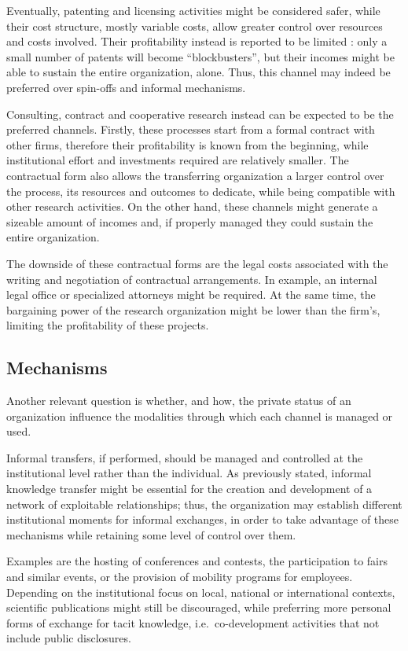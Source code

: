 Eventually, patenting and licensing activities might be considered safer, while their cost structure, mostly variable costs, allow greater control over resources and costs involved. Their profitability instead is reported to be limited \citep{Balderi2010}: only a small number of patents will become \enquote{blockbusters}, but their incomes might be able to sustain the entire organization, alone. Thus, this channel may indeed be preferred over spin-offs and informal mechanisms.

Consulting, contract and cooperative research instead can be expected to be the preferred channels. Firstly, these processes start from a formal contract with other firms, therefore their profitability is known from the beginning, while institutional effort and investments required are relatively smaller. The contractual form also allows the transferring organization a larger control over the process, its resources and outcomes to dedicate, while being compatible with other research activities. On the other hand, these channels might generate a sizeable amount of incomes and, if properly managed they could sustain the entire organization. 

The downside of these contractual forms are the legal costs associated with the writing and negotiation of contractual arrangements. In example, an internal legal office or specialized attorneys might be required. At the same time, the bargaining power of the research organization might be lower than the firm's, limiting the profitability of these projects. 

\subsection{Mechanisms}

Another relevant question is whether, and how, the private status of an organization influence the modalities through which each channel is managed or used. 

Informal transfers, if performed, should be managed and controlled at the institutional level rather than the individual. As previously stated, informal knowledge transfer might be essential for the creation and development of a network of exploitable relationships; thus, the organization may establish different institutional moments for informal exchanges, in order to take advantage of these mechanisms while retaining some level of control over them. 

Examples are the hosting of conferences and contests, the participation to fairs and similar events, or the provision of mobility programs for employees. Depending on the institutional focus on local, national or international contexts, scientific publications might still be discouraged, while preferring more personal forms of exchange for tacit knowledge, i.e.\ co-development activities that not include public disclosures. 

